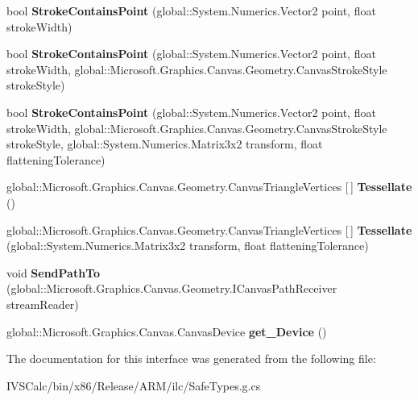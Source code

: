 \begin{DoxyCompactItemize}
bool {\bfseries Stroke\+Contains\+Point} (global\+::\+System.\+Numerics.\+Vector2 point, float stroke\+Width)
\item 
\mbox{\label{interface_microsoft_1_1_graphics_1_1_canvas_1_1_geometry_1_1_i_canvas_geometry_a749861cc7df09da3d826703f624d3aa2}} 
bool {\bfseries Stroke\+Contains\+Point} (global\+::\+System.\+Numerics.\+Vector2 point, float stroke\+Width, global\+::\+Microsoft.\+Graphics.\+Canvas.\+Geometry.\+Canvas\+Stroke\+Style stroke\+Style)
\item 
\mbox{\label{interface_microsoft_1_1_graphics_1_1_canvas_1_1_geometry_1_1_i_canvas_geometry_a8c8e0234f10f24e16c5e23af24012c5a}} 
bool {\bfseries Stroke\+Contains\+Point} (global\+::\+System.\+Numerics.\+Vector2 point, float stroke\+Width, global\+::\+Microsoft.\+Graphics.\+Canvas.\+Geometry.\+Canvas\+Stroke\+Style stroke\+Style, global\+::\+System.\+Numerics.\+Matrix3x2 transform, float flattening\+Tolerance)
\item 
\mbox{\label{interface_microsoft_1_1_graphics_1_1_canvas_1_1_geometry_1_1_i_canvas_geometry_a3dc1c0c2642c9d24d0f9bae6c3181968}} 
global\+::\+Microsoft.\+Graphics.\+Canvas.\+Geometry.\+Canvas\+Triangle\+Vertices \mbox{[}$\,$\mbox{]} {\bfseries Tessellate} ()
\item 
\mbox{\label{interface_microsoft_1_1_graphics_1_1_canvas_1_1_geometry_1_1_i_canvas_geometry_a2f5903941962961821c79b2142291f25}} 
global\+::\+Microsoft.\+Graphics.\+Canvas.\+Geometry.\+Canvas\+Triangle\+Vertices \mbox{[}$\,$\mbox{]} {\bfseries Tessellate} (global\+::\+System.\+Numerics.\+Matrix3x2 transform, float flattening\+Tolerance)
\item 
\mbox{\label{interface_microsoft_1_1_graphics_1_1_canvas_1_1_geometry_1_1_i_canvas_geometry_a085e2ad8f4fb755784ee6b62d52ca3c1}} 
void {\bfseries Send\+Path\+To} (global\+::\+Microsoft.\+Graphics.\+Canvas.\+Geometry.\+I\+Canvas\+Path\+Receiver stream\+Reader)
\item 
\mbox{\label{interface_microsoft_1_1_graphics_1_1_canvas_1_1_geometry_1_1_i_canvas_geometry_a53a8c779859965ce77af229c8b35d7dd}} 
global\+::\+Microsoft.\+Graphics.\+Canvas.\+Canvas\+Device {\bfseries get\+\_\+\+Device} ()
\end{DoxyCompactItemize}


The documentation for this interface was generated from the following file\+:\begin{DoxyCompactItemize}
\item 
I\+V\+S\+Calc/bin/x86/\+Release/\+A\+R\+M/ilc/Safe\+Types.\+g.\+cs\end{DoxyCompactItemize}
